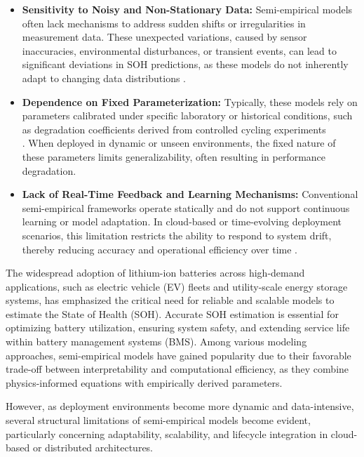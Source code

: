 \begin{itemize}
    \item \textbf{Sensitivity to Noisy and Non-Stationary Data:} Semi-empirical models often lack mechanisms to address sudden shifts or irregularities in measurement data. These unexpected variations, caused by sensor inaccuracies, environmental disturbances, or transient events, can lead to significant deviations in SOH predictions, as these models do not inherently adapt to changing data distributions \cite{s21248304}.
    
    \item \textbf{Dependence on Fixed Parameterization:} Typically, these models rely on parameters calibrated under specific laboratory or historical conditions, such as degradation coefficients derived from controlled cycling experiments\\ \cite{doi:10.1021/ie990486w}. When deployed in dynamic or unseen environments, the fixed nature of these parameters limits generalizability, often resulting in performance degradation.
    
    \item \textbf{Lack of Real-Time Feedback and Learning Mechanisms:} Conventional semi-empirical frameworks operate statically and do not support continuous learning or model adaptation. In cloud-based or time-evolving deployment scenarios, this limitation restricts the ability to respond to system drift, thereby reducing accuracy and operational efficiency over time \cite{7462263,8633871}.
\end{itemize}

The widespread adoption of lithium-ion batteries across high-demand applications, such as electric vehicle (EV) fleets and utility-scale energy storage systems, has emphasized the critical need for reliable and scalable models to estimate the State of Health (SOH). Accurate SOH estimation is essential for optimizing battery utilization, ensuring system safety, and extending service life within battery management systems (BMS). Among various modeling approaches, semi-empirical models have gained popularity due to their favorable trade-off between interpretability and computational efficiency, as they combine physics-informed equations with empirically derived parameters.

However, as deployment environments become more dynamic and data-intensive, several structural limitations of semi-empirical models become evident, particularly concerning adaptability, scalability, and lifecycle integration in cloud-based or distributed architectures.

